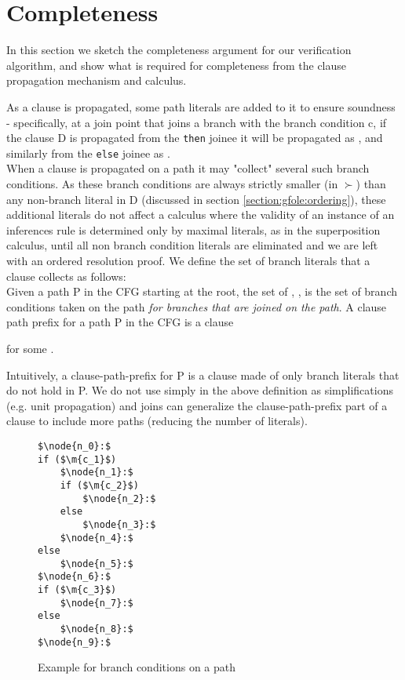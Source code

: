 
\section{Completeness}
In this section we sketch the completeness argument for our verification algorithm, and show what is required for completeness from the clause propagation mechanism and calculus.

As a clause is propagated, some path literals are added to it to ensure soundness - specifically, 
at a join point that joins a branch with the branch condition c, if the clause D is propagated from the \lstinline|then| joinee it will be propagated as , and similarly from the \lstinline|else| joinee as .\\
When a clause is propagated on a path it may "collect" several such branch conditions. As these branch conditions are always strictly smaller (in $\succ$) than any non-branch literal in D (discussed in section \ref{section:gfole:ordering}), these additional literals do not affect a calculus where the validity of an instance of an inferences rule is determined only by maximal literals, as in the superposition calculus, until all non branch condition literals are eliminated and we are left with an ordered resolution proof.
We define the set of branch literals that a clause collects as follows:\\
Given a path P in the CFG starting at the root, the set of , , 
is the set of branch conditions taken on the path \emph{for branches that are joined on the path}. 
A clause path prefix for a path P in the CFG is a clause

\bigskip

\noindent{} for some .

\bigskip

Intuitively, a clause-path-prefix for P is a clause made of only branch literals that do not hold in P.  
We do not use simply  in the above definition as simplifications (e.g. unit propagation) and joins can generalize the clause-path-prefix part of a clause to include more paths (reducing the number of literals). 

\begin{figure}
\begin{lstlisting}
$\node{n_0}:$
if ($\m{c_1}$)
	$\node{n_1}:$	
	if ($\m{c_2}$)
		$\node{n_2}:$
	else
		$\node{n_3}:$
	$\node{n_4}:$
else	
	$\node{n_5}:$
$\node{n_6}:$
if ($\m{c_3}$)
	$\node{n_7}:$
else
	$\node{n_8}:$
$\node{n_9}:$
\end{lstlisting}
\caption{Example for branch conditions on a path\\
}
\label{snippet4.1.4.4}
\end{figure}

